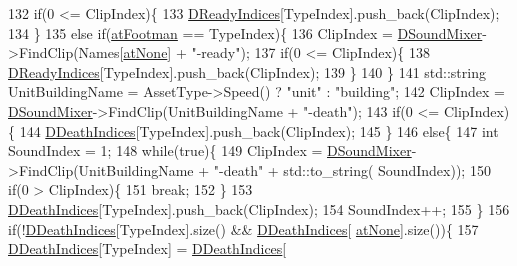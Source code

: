 \begin{DoxyCode}
132         \textcolor{keywordflow}{if}(0 <= ClipIndex)\{
133             \hyperlink{classCSoundEventRenderer_a68d2be3282880d4d7b47ee94b0a30139}{DReadyIndices}[TypeIndex].push\_back(ClipIndex);
134         \}
135         \textcolor{keywordflow}{else} \textcolor{keywordflow}{if}(\hyperlink{GameDataTypes_8h_a5600d4fc433b83300308921974477fecad586e8ff9ee846d22630c2066e8fb7c2}{atFootman} == TypeIndex)\{
136             ClipIndex = \hyperlink{classCSoundEventRenderer_a5abf598a7e8783d9cc78e0d33a65c9c2}{DSoundMixer}->FindClip(Names[\hyperlink{GameDataTypes_8h_a5600d4fc433b83300308921974477feca82fb51718e2c00981a2d37bc6fe92593}{atNone}] + \textcolor{stringliteral}{"-ready"});
137             \textcolor{keywordflow}{if}(0 <= ClipIndex)\{
138                 \hyperlink{classCSoundEventRenderer_a68d2be3282880d4d7b47ee94b0a30139}{DReadyIndices}[TypeIndex].push\_back(ClipIndex);
139             \}
140         \}
141         std::string UnitBuildingName = AssetType->Speed() ? \textcolor{stringliteral}{"unit"} : \textcolor{stringliteral}{"building"};
142         ClipIndex = \hyperlink{classCSoundEventRenderer_a5abf598a7e8783d9cc78e0d33a65c9c2}{DSoundMixer}->FindClip(UnitBuildingName + \textcolor{stringliteral}{"-death"});
143         \textcolor{keywordflow}{if}(0 <= ClipIndex)\{
144             \hyperlink{classCSoundEventRenderer_a6b250e51c42870715c12ea47b99b9594}{DDeathIndices}[TypeIndex].push\_back(ClipIndex);
145         \}
146         \textcolor{keywordflow}{else}\{
147             \textcolor{keywordtype}{int} SoundIndex = 1;
148             \textcolor{keywordflow}{while}(\textcolor{keyword}{true})\{
149                 ClipIndex = \hyperlink{classCSoundEventRenderer_a5abf598a7e8783d9cc78e0d33a65c9c2}{DSoundMixer}->FindClip(UnitBuildingName + \textcolor{stringliteral}{"-death"} + std::to\_string(
      SoundIndex));
150                 \textcolor{keywordflow}{if}(0 > ClipIndex)\{
151                     \textcolor{keywordflow}{break};   
152                 \}
153                 \hyperlink{classCSoundEventRenderer_a6b250e51c42870715c12ea47b99b9594}{DDeathIndices}[TypeIndex].push\_back(ClipIndex);
154                 SoundIndex++;
155             \}
156             \textcolor{keywordflow}{if}(!\hyperlink{classCSoundEventRenderer_a6b250e51c42870715c12ea47b99b9594}{DDeathIndices}[TypeIndex].size() && \hyperlink{classCSoundEventRenderer_a6b250e51c42870715c12ea47b99b9594}{DDeathIndices}[
      \hyperlink{GameDataTypes_8h_a5600d4fc433b83300308921974477feca82fb51718e2c00981a2d37bc6fe92593}{atNone}].size())\{
157                 \hyperlink{classCSoundEventRenderer_a6b250e51c42870715c12ea47b99b9594}{DDeathIndices}[TypeIndex] = \hyperlink{classCSoundEventRenderer_a6b250e51c42870715c12ea47b99b9594}{DDeathIndices}[

\end{DoxyCode}
